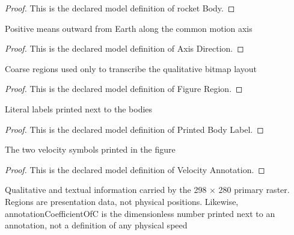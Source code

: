 \begin{proof}
  This is the declared model definition of rocket Body.
\end{proof}
\begin{definition}
  \label{def:physics:phyx-mini-0621:phyxminiproblems-problemphyxmini0621-axisdirection}
  Positive means outward from Earth along the common motion axis
\end{definition}
\begin{proof}
  This is the declared model definition of Axis Direction.
\end{proof}
\begin{definition}
  \label{def:physics:phyx-mini-0621:phyxminiproblems-problemphyxmini0621-figureregion}
  Coarse regions used only to transcribe the qualitative bitmap layout
\end{definition}
\begin{proof}
  This is the declared model definition of Figure Region.
\end{proof}
\begin{definition}
  \label{def:physics:phyx-mini-0621:phyxminiproblems-problemphyxmini0621-printedbodylabel}
  Literal labels printed next to the bodies
\end{definition}
\begin{proof}
  This is the declared model definition of Printed Body Label.
\end{proof}
\begin{definition}
  \label{def:physics:phyx-mini-0621:phyxminiproblems-problemphyxmini0621-velocityannotation}
  The two velocity symbols printed in the figure
\end{definition}
\begin{proof}
  This is the declared model definition of Velocity Annotation.
\end{proof}
\begin{definition}
  \label{def:physics:phyx-mini-0621:phyxminiproblems-problemphyxmini0621-rocketvelocityfigure}
  Qualitative and textual information carried by the 298 × 280 primary raster. Regions are presentation data, not physical positions. Likewise, annotationCoefficientOfC is the dimensionless number printed next to an annotation, not a definition of any physical speed
\end{definition}
